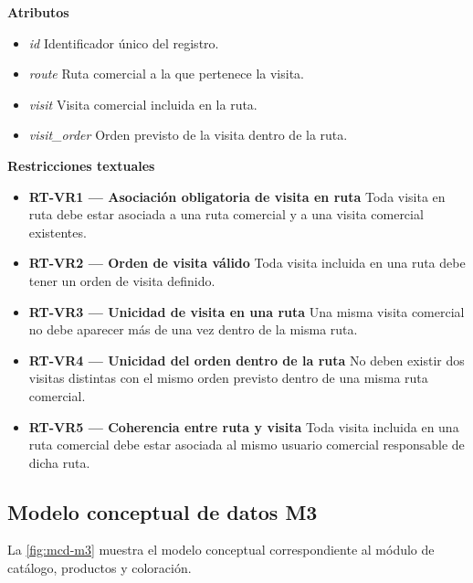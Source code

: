 \textbf{Atributos}

\begin{itemize}
      \item \textit{id}
            Identificador único del registro.
      \item \textit{route}
            Ruta comercial a la que pertenece la visita.
      \item \textit{visit}
            Visita comercial incluida en la ruta.
      \item \textit{visit\_order}
            Orden previsto de la visita dentro de la ruta.
\end{itemize}

\textbf{Restricciones textuales}

\begin{itemize}
      \item \textbf{RT-VR1 — Asociación obligatoria de visita en ruta}
            Toda visita en ruta debe estar asociada a una ruta comercial y a una visita comercial existentes.
      \item \textbf{RT-VR2 — Orden de visita válido}
            Toda visita incluida en una ruta debe tener un orden de visita definido.
      \item \textbf{RT-VR3 — Unicidad de visita en una ruta}
            Una misma visita comercial no debe aparecer más de una vez dentro de la misma ruta.
      \item \textbf{RT-VR4 — Unicidad del orden dentro de la ruta}
            No deben existir dos visitas distintas con el mismo orden previsto dentro de una misma ruta comercial.
      \item \textbf{RT-VR5 — Coherencia entre ruta y visita}
            Toda visita incluida en una ruta comercial debe estar asociada al mismo usuario comercial responsable de dicha ruta.
\end{itemize}

\subsection{Modelo conceptual de datos M3}

La \autoref{fig:mcd-m3} muestra el modelo conceptual correspondiente al módulo de catálogo, productos y coloración.


